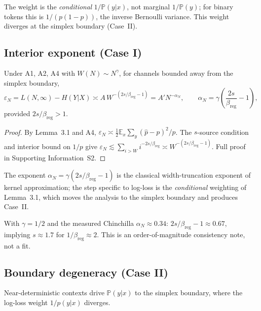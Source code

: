 \documentclass[entropy,article,submit,moreauthors,pdftex]{mdpi}
\newcommand{\eps}{\varepsilon}
\newcommand{\E}{\mathbb{E}}
\newcommand{\Prob}{\mathbb{P}}
\begin{document}
\begin{remark}
\label{rem:conditional}
The weight is the \emph{conditional} $1/\Prob(y|x)$, not marginal
$1/\Prob(y)$; for binary tokens this is $1/(p(1-p))$, the inverse Bernoulli
variance.  This weight diverges at the simplex boundary (Case~II).
\end{remark}

\subsection{Interior exponent (Case I)}
\begin{theorem}
\label{thm:modelN}
Under A1, A2, A4 with $W(N)\sim N^{\gamma}$, for channels bounded away from
the simplex boundary,
\begin{equation}
  \eps_N = L(N,\infty) - H(Y|X) \asymp A\, W^{-(2s/\beta_{\mathrm{reg}}-1)}
  = A' N^{-\alpha_N},
  \qquad \alpha_N=\gamma\left(\frac{2s}{\beta_{\mathrm{reg}}}-1\right),
  \label{eq:modelN}
\end{equation}
provided $2s/\beta_{\mathrm{reg}}>1$.
\end{theorem}

\begin{proof}
By Lemma~3.1 and A4, $\eps_N\!\asymp\!\frac12\E_x\sum_y
(\hat p\!-\!p)^2/p$. The $s$-source condition and interior bound on $1/p$ give
$\eps_N\!\lesssim\!\sum_{i>W} i^{-2s/\beta_{\mathrm{reg}}}
\!\asymp\! W^{-(2s/\beta_{\mathrm{reg}}-1)}$.
Full proof in Supporting Information~S2.
\end{proof}

The exponent $\alpha_N=\gamma(2s/\beta_{\mathrm{reg}}-1)$ is the classical
width-truncation exponent of kernel approximation; the step specific to log-loss is
the \emph{conditional} weighting of Lemma~3.1, which moves the
analysis to the simplex boundary and produces Case~II.

\begin{remark}
\label{rem:chinchilla}
With $\gamma=1/2$ and the measured Chinchilla $\alpha_N\approx0.34$:
$2s/\beta_{\mathrm{reg}}-1\approx0.67$, implying $s\approx1.7$ for
$1/\beta_{\mathrm{reg}}\approx2$. This is an order-of-magnitude consistency note, not a fit.
\end{remark}

\subsection{Boundary degeneracy (Case II)}
Near-deterministic contexts drive $\Prob(y|x)$ to the simplex boundary, where
the log-loss weight $1/p(y|x)$ diverges.
\end{document}
